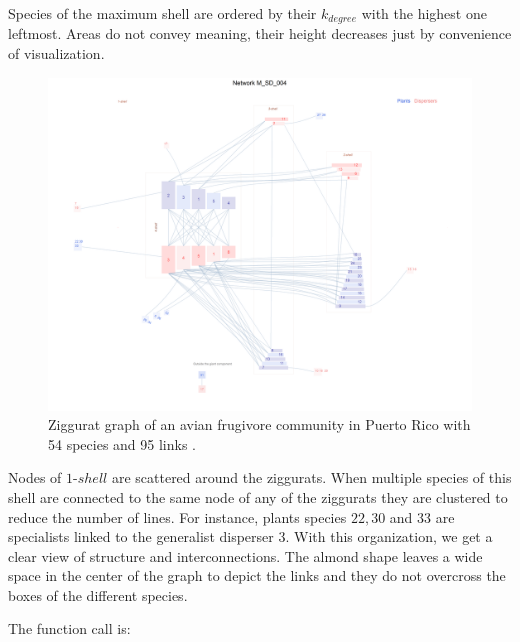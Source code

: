 \documentclass[12pt]{article}
\begin{document}
Species of the maximum shell are ordered by their $k_{degree}$ with the highest one leftmost. Areas do not convey meaning, their height decreases just by convenience of visualization. 

\begin{figure}[hp!]
\centering
\includegraphics[scale=0.4]{M_SD_004_ziggurat.png}
\caption {Ziggurat graph of an avian frugivore community in Puerto Rico with 54 species and 95 links \cite{carlo2003avian}.}
\label{fig:KMAN_ziggurat}
\end{figure}

Nodes of $1$-$shell$ are scattered around the ziggurats. When multiple species of this shell are connected to the same node of any of the ziggurats they are clustered to reduce the number of lines. For instance, plants species $22, 30$ and $33$ are specialists linked to the generalist disperser $3$. With this organization, we get a clear view of structure and interconnections. The almond shape leaves a wide space in the center of the graph to depict the links and they do not overcross the boxes of the different species.

\noindent The function call is:
\end{document}
